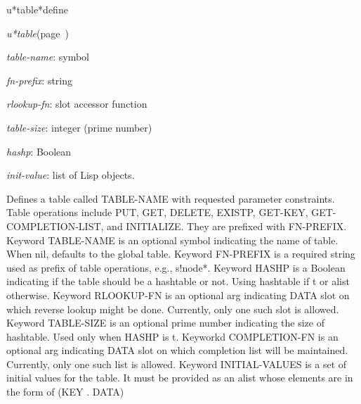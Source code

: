 \begin{description}
\item [Name:]  u*table*define

\item [Class:]
{\sl u*table}\hfill(page~\pageref{u*table})

\item [Parameters:]
\item {\sl table-name}:  symbol

\item {\sl fn-prefix}:  string

\item {\sl rlookup-fn}:  slot accessor function

\item {\sl table-size}:  integer (prime number)

\item {\sl hashp}:  Boolean 

\item {\sl init-value}:  list of Lisp objects.


\item [Return-value:]

\item [Description:]
Defines a table called TABLE-NAME with requested parameter
constraints. Table operations include PUT, GET, DELETE, EXISTP,
GET-KEY, GET-COMPLETION-LIST, and INITIALIZE. They are prefixed with
FN-PREFIX.
Keyword TABLE-NAME is an optional symbol indicating the name of
table. When nil, defaults to the global table.  
Keyword FN-PREFIX is a required string used as prefix of table
operations, e.g., s!node*.
Keyword HASHP is a Boolean indicating if the table should be a
hashtable or not.  Using hashtable if t or alist otherwise.
Keyword RLOOKUP-FN is an optional arg indicating DATA slot on
which reverse lookup might be done. Currently, only one such
slot is allowed.
Keyword TABLE-SIZE is an optional prime number indicating the
size of hashtable.  Used only when HASHP is t.
Keyworkd COMPLETION-FN is an optional arg indicating DATA slot
on which completion list will be maintained. Currently, only one
such list is allowed.
Keyword INITIAL-VALUES is a set of initial values for the table.
It must be provided as an alist whose elements are in the form
of (KEY . DATA)

\item [Public:]



\end{description}
\horizontalline

